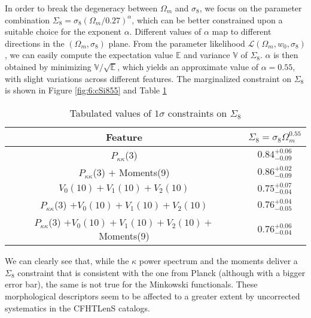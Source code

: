 In order to break the degeneracy between $\Omega_m$ and $\sigma_8$, we focus on the parameter combination $\Sigma_8=\sigma_8(\Omega_m/0.27)^\alpha$, which can be better constrained upon a suitable choice for the exponent $\alpha$. Different values of $\alpha$ map to different directions in the $(\Omega_m,\sigma_8)$ plane. From the parameter likelihood $\mathcal{L}(\Omega_m,w_0,\sigma_8)$, we can easily compute the expectation value $\mathds{E}$ and variance $\mathds{V}$ of $\Sigma_8$. $\alpha$ is then obtained by minimizing $\mathds{V}/\sqrt{\mathds{E}}$, which yields an approximate value of $\alpha=0.55$, with slight variations across different features. The marginalized constraint on $\Sigma_8$ is shown in Figure \ref{fig:6:cSi855} and Table \ref{tab:6:Si8}
%
\begin{table}
\begin{center}
\begin{tabular}{c|c}
\textbf{Feature} & $\Sigma_8=\sigma_8\Omega_m^{0.55}$ \\ \hline \hline
$P_{\kappa\kappa}$(3) & $0.84^{+0.06}_{-0.09}$\\
$P_{\kappa\kappa}$(3) $+$ Moments(9) & $0.86^{+0.02}_{-0.09}$ \\
$V_0(10)+ V_1(10) + V_2(10)$  & $0.75^{+0.07}_{-0.04}$ \\
$P_{\kappa\kappa}$(3) $+ V_0(10)+ V_1(10) + V_2(10)$ & $0.76^{+0.04}_{-0.05}$ \\
$P_{\kappa\kappa}$(3) $+ V_0(10)+ V_1(10) + V_2(10) +$ Moments(9) & $0.76^{+0.06}_{-0.04}$ \\ \hline
\end{tabular}
\end{center}
\caption{Tabulated values of $1\sigma$ constraints on $\Sigma_8$}
\label{tab:6:Si8}
\end{table}
%
We can clearly see that, while the $\kappa$ power spectrum and the moments deliver a $\Sigma_8$ constraint that is consistent with the one from Planck \citep{Planck15} (although with a bigger error bar), the same is not true for the Minkowski functionals. These morphological descriptors seem to be affected to a greater extent by uncorrected systematics in the CFHTLenS catalogs.     

